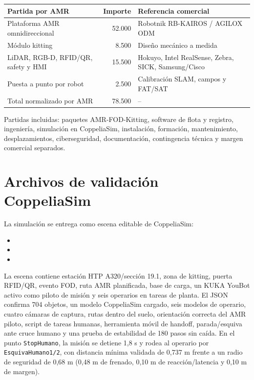 \begin{tcolorbox}
\vspace{0.4em}
\scriptsize
\begin{tabularx}{\textwidth}{Y r Y}
\toprule
Partida por AMR & Importe & Referencia comercial\\
\midrule
Plataforma AMR omnidireccional & 52.000 & Robotnik RB-KAIROS / AGILOX ODM\\
Módulo kitting & 8.500 & Diseño mecánico a medida\\
LiDAR, RGB-D, RFID/QR, safety y HMI & 15.500 & Hokuyo, Intel RealSense, Zebra, SICK, Samsung/Cisco\\
Puesta a punto por robot & 2.500 & Calibración SLAM, campos y FAT/SAT\\
\midrule
Total normalizado por AMR & 78.500 & --\\
\bottomrule
\end{tabularx}
\normalsize

\vspace{0.4em}
Partidas incluidas: paquetes AMR-FOD-Kitting, software de flota y registro, ingeniería, simulación en CoppeliaSim, instalación, formación, mantenimiento, desplazamientos, ciberseguridad, documentación, contingencia técnica y margen comercial separados.
\end{tcolorbox}

\section{Archivos de validación CoppeliaSim}

La simulación se entrega como escena editable de CoppeliaSim:

\begin{itemize}
  \item {}
  \item {}
  \item {}
\end{itemize}

La escena contiene estación HTP A320/sección 19.1, zona de kitting, puerta RFID/QR, evento FOD, ruta AMR planificada, base de carga, un KUKA YouBot activo como piloto de misión y seis operarios en tareas de planta. El JSON confirma 704 objetos, un modelo CoppeliaSim cargado, seis modelos de operario, cuatro cámaras de captura, rutas dentro del suelo, orientación correcta del AMR piloto, script de tareas humanas, herramienta móvil de handoff, parada/esquiva ante cruce humano y una prueba de estabilidad de 180 pasos sin caída. En el punto \texttt{StopHumano}, la misión se detiene 1,8 s y rodea al operario por \texttt{EsquivaHumano1/2}, con distancia mínima validada de 0,737 m frente a un radio de seguridad de 0,68 m (0,48 m de frenado, 0,10 m de reacción/latencia y 0,10 m de margen).


